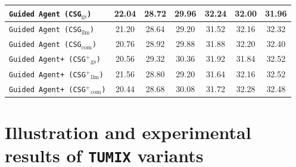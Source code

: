 \begin{table}[ht]
\begin{tabular}{|>{\raggedright\arraybackslash}m{5cm}|c|c|c|c|c|c|}
\hline
\texttt{Guided Agent (CSG$_{\text{gs}}$)} & 22.04 & 28.72 & 29.96 & 32.24 & 32.00 & 31.96 \\
\hline
\texttt{Guided Agent (CSG$_{\text{llm}}$)} & 21.20 & 28.64 & 29.20 & 31.52 & 32.16 & 32.32 \\
\hline
\texttt{Guided Agent (CSG$_{\text{com}}$)} & 20.76 & 28.92 & 29.88 & 31.88 & 32.20 & 32.40 \\
\hline
\texttt{Guided Agent+ (CSG$^{+}$$_{\text{gs}}$)} & 20.56 & 29.32 & 30.36 & 31.92 & 31.84 & 32.52 \\
\hline
\texttt{Guided Agent+ (CSG$^{+}$$_{\text{llm}}$)} & 21.56 & 28.80 & 29.20 & 31.64 & 32.16 & 32.52 \\
\hline
\texttt{Guided Agent+ (CSG$^{+}$$_{\text{com}}$)} & 20.44 & 28.68 & 30.08 & 31.72 & 32.28 & 32.48 \\
\hline
\end{tabular}
\end{table}

\newpage
\section{Illustration and experimental results of \texttt{TUMIX} variants}
\label{appendix sec: Experimental results of TUMIX variants}

